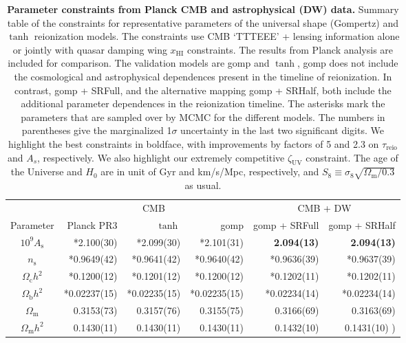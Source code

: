 \documentclass[12pt]{article}
\newcommand{\sampled}{*}
\newcommand{\As}{A_\mathrm{s}}
\newcommand{\ns}{n_\mathrm{s}}
\newcommand{\Omegam}{\Omega_\mathrm{m}}
\newcommand{\Omegac}{\Omega_\mathrm{c}}
\newcommand{\Omegab}{\Omega_\mathrm{b}}
\newcommand{\zetaUV}{\zeta_\mathrm{UV}}
\newcommand{\HI}{\mathrm{HI}}
\newcommand{\reio}{\mathrm{reio}}
\begin{document}
\begin{table}
\centering
\caption{\textbf{Parameter constraints from Planck CMB and astrophysical
(DW) data.}
Summary table of the constraints for representative parameters of the
universal shape (Gompertz) and $\tanh$ reionization models.
The constraints use CMB `TTTEEE' + lensing information alone or jointly
with quasar damping wing $x_\HI$ constraints.
The results from Planck analysis \cite{Planck2020a} are included for
comparison.
The validation models are gomp and $\tanh$, gomp does not include the
cosmological and astrophysical dependences present in the timeline
of reionization.
In contrast, gomp + SRFull, and the alternative mapping gomp + SRHalf,
both include the additional parameter dependences in the reionization
timeline.
The asterisks mark the parameters that are sampled over by MCMC for the
different models.
The numbers in parentheses give the marginalized 1$\sigma$ uncertainty
in the last two significant digits.
We highlight the best constraints in boldface, with improvements by
factors of 5 and 2.3 on $\tau_\reio$ and $A_s$, respectively.
We also highlight our extremely competitive $\zetaUV$ constraint.
The age of the Universe and $H_0$ are in unit of Gyr and km/s/Mpc,
respectively, and $S_8 \equiv \sigma_8 \sqrt{\Omegam/0.3}$ as usual.}
\small
\begin{tabular*}{0.95\textwidth}{c *{3}{r} @{\extracolsep{\fill}} *{2}{r}}
\hline
 & \multicolumn{3}{c}{CMB} & \multicolumn{2}{c}{CMB + DW} \\
\cline{2-4} \cline{5-6}
Parameter & Planck PR3\cite{Planck2020a} & $\tanh$ & gomp & gomp + SRFull & gomp + SRHalf \\
\hline
$10^{9} \As$ & \sampled 2.100(30) & \sampled 2.099(30) & \sampled 2.101(31) & \textbf{2.094(13)} & \textbf{2.094(13)} \\
$\ns$ & \sampled 0.9649(42) & \sampled 0.9641(42) & \sampled 0.9640(42) & \sampled 0.9636(39) & \sampled 0.9637(39) \\
$\Omegac h^2$ & \sampled 0.1200(12) & \sampled 0.1201(12) & \sampled 0.1200(12) & \sampled 0.1202(11) & \sampled 0.1202(11) \\
$\Omegab h^2$ & \sampled 0.02237(15) & \sampled 0.02235(15) & \sampled 0.02235(15) & \sampled 0.02234(14) & \sampled 0.02234(14) \\
$\Omegam$ & 0.3153(73) & 0.3157(76) & 0.3155(75) & 0.3166(69) & 0.3163(69) \\
$\Omegam h^2$ & 0.1430(11) & 0.1430(11) & 0.1430(11) & 0.1432(10) & 0.1431(10) ) \\

\end{tabular*}
\end{table}
\end{document}
